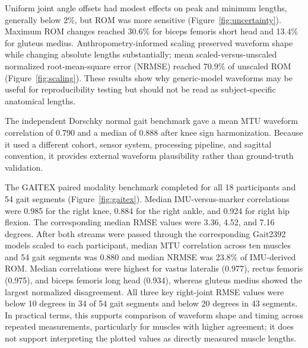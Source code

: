 \documentclass[11pt]{article}
\begin{document}
Uniform joint angle offsets had modest effects on peak and minimum lengths, generally below 2\%, but ROM was more sensitive (Figure~\ref{fig:uncertainty}). Maximum ROM changes reached 30.6\% for biceps femoris short head and 13.4\% for gluteus medius. Anthropometry-informed scaling preserved waveform shape while changing absolute lengths substantially; mean scaled-versus-unscaled normalized root-mean-square error (NRMSE) reached 70.9\% of unscaled ROM (Figure~\ref{fig:scaling}). These results show why generic-model waveforms may be useful for reproducibility testing but should not be read as subject-specific anatomical lengths.

The independent Dorschky normal gait benchmark gave a mean MTU waveform correlation of 0.790 and a median of 0.888 after knee sign harmonization. Because it used a different cohort, sensor system, processing pipeline, and sagittal convention, it provides external waveform plausibility rather than ground-truth validation.

The GAITEX paired modality benchmark completed for all 18 participants and 54 gait segments (Figure~\ref{fig:gaitex}). Median IMU-versus-marker correlations were 0.985 for the right knee, 0.884 for the right ankle, and 0.924 for right hip flexion. The corresponding median RMSE values were 3.36, 4.52, and 7.16 degrees. After both streams were passed through the corresponding Gait2392 models scaled to each participant, median MTU correlation across ten muscles and 54 gait segments was 0.880 and median NRMSE was 23.8\% of IMU-derived ROM. Median correlations were highest for vastus lateralis (0.977), rectus femoris (0.975), and biceps femoris long head (0.934), whereas gluteus medius showed the largest normalized disagreement. All three key right-joint RMSE values were below 10 degrees in 34 of 54 gait segments and below 20 degrees in 43 segments. In practical terms, this supports comparison of waveform shape and timing across repeated measurements, particularly for muscles with higher agreement; it does not support interpreting the plotted values as directly measured muscle lengths.
\end{document}
